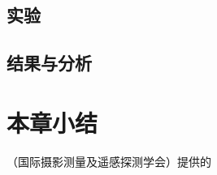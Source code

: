 \subsection{实验}
\label{sec:third-2}

\subsection{结果与分析}
\label{sec:third-3}

\section{本章小结}
\label{sec:forth}
（国际摄影测量及遥感探测学会）提供的
